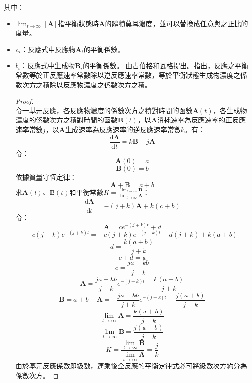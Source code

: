 \documentclass[a4paper,12pt]{article}
\begin{document}
其中：
\begin{itemize}
\item $\lim_{t\to\infty}[\mathbf{A}]$指平衡狀態時$\mathbf{A}$的體積莫耳濃度，並可以替換成任意與之正比的度量。
\item $a_i$：反應式中反應物$\mathbf{A}_i$的平衡係數。
\item $b_i$：反應式中生成物$\mathbf{B}_i$的平衡係數。
\eit
{}
由古伯格和瓦格提出。指出，反應之平衡常數等於正反應速率常數除以逆反應速率常數，等於平衡狀態生成物濃度之係數次方之積除以反應物濃度之係數次方之積。
\begin{proof}\mbox{}\\
令一基元反應，各反應物濃度的係數次方之積對時間的函數$\mathbf{A}(t)$，各生成物濃度的係數次方之積對時間的函數$\mathbf{B}(t)$，以$\mathbf{A}$消耗速率為反應速率的正反應速率常數$j$，以$\mathbf{A}$生成速率為反應速率的逆反應速率常數$k$。有：
\[\frac{\mathrm{d}\mathbf{A}}{\mathrm{d}t}=k\mathbf{B}-j\mathbf{A}\]
令：
\[\mathbf{A}(0)=a\]
\[\mathbf{B}(0)=b\]
依據質量守恆定律：
\[\mathbf{A}+\mathbf{B}=a+b\]
求$\mathbf{A}(t)$、$\mathbf{B}(t)$和平衡常數$K=\frac{\lim_{t\to\infty}\mathbf{B}}{\lim_{t\to\infty}\mathbf{A}}$：
\[\frac{\mathrm{d}\mathbf{A}}{\mathrm{d}t}=-(j+k)\mathbf{A}+k(a+b)\]
令：
\[\mathbf{A}=ce^{-(j+k)t}+d\]
\[-c(j+k)e^{-(j+k)t}=-c(j+k)e^{-(j+k)t}-d(j+k)+k(a+b)\]
\[d=\frac{k(a+b)}{j+k}\]
\[c+d=a\]
\[c=\frac{ja-kb}{j+k}\]
\[\mathbf{A}=\frac{ja-kb}{j+k}e^{-(j+k)t}+\frac{k(a+b)}{j+k}\]
\[\mathbf{B}=a+b-\mathbf{A}=-\frac{ja-kb}{j+k}e^{-(j+k)t}+\frac{j(a+b)}{j+k}\]
\[\lim_{t\to\infty}\mathbf{A}=\frac{k(a+b)}{j+k}\]
\[\lim_{t\to\infty}\mathbf{B}=\frac{j(a+b)}{j+k}\]
\[K=\frac{\lim_{t\to\infty}\mathbf{B}}{\lim_{t\to\infty}\mathbf{A}}=\frac{j}{k}\]
由於基元反應係數即級數，連乘後全反應的平衡定律式必可將級數次方約分為係數次方。
\end{proof}

\end{itemize}
\end{document}
